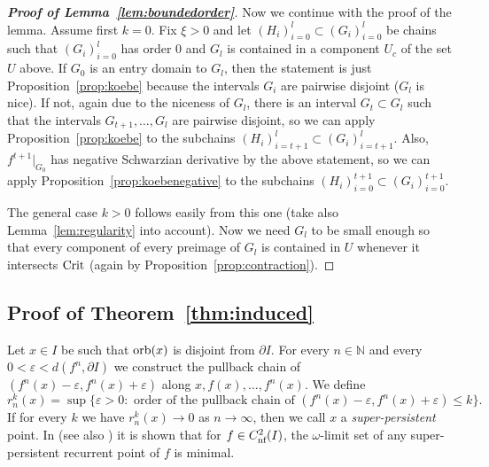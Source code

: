 \documentclass[12pt, psamsfonts, reqno]{amsart}
\newtheorem{theorem}{Theorem}
\begin{document}
\begin{proof}[\textbf{Proof of Lemma~\ref{lem:boundedorder}}]
Now we continue with the proof of the lemma. Assume first $k=0$.
Fix $\xi>0$ and let $(H_i)_{i=0}^l\subset (G_i)_{i=0}^l$ be chains
such that $(G_i)_{i=0}^l$ has order $0$ and $G_l$ is contained in
a component $U_c$ of the set $U$ above. If $G_0$ is an entry
domain to $G_l$, then the statement is just
Proposition~\ref{prop:koebe} because the intervals $G_i$ are
pairwise disjoint ($G_l$ is nice). If not, again due to the
niceness of $G_l$, there is an interval $G_t\subset G_l$ such that
the intervals $G_{t+1},\ldots, G_l$ are pairwise disjoint, so we
can apply Proposition~\ref{prop:koebe} to the subchains
$(H_i)_{i=t+1}^l\subset (G_i)_{i=t+1}^l$. Also, $f^{t+1}|_{G_0}$
has negative Schwarzian derivative by the above statement, so we
can apply Proposition~\ref{prop:koebenegative} to the subchains
$(H_i)_{i=0}^{t+1}\subset (G_i)_{i=0}^{t+1}$.

The general case $k>0$ follows easily from this one (take also
Lemma~\ref{lem:regularity} into account). Now we need $G_l$ to be
small enough so that every component of every preimage of $G_l$ is
contained in $U$ whenever it intersects ${\mathop{\rm Crit}\nolimits}$ (again by
Proposition~\ref{prop:contraction}).
\end{proof}

\subsection{Proof of Theorem~\ref{thm:induced}}

Let $x\in I$ be such that ${\mathop{\rm orb}\nolimits}(x)$ is disjoint from
$\partial I$.
For every $n \in {{\mathbb N}}$ and every $0 < {\varepsilon} < d(f^n, \partial I)$ we
construct the pullback chain of $(f^n(x)-{\varepsilon},f^n(x)+{\varepsilon})$ along
$x,f(x),\ldots,f^n(x)$. We
define
$$
r_n^k(x) = \sup\{ {\varepsilon} > 0 : \text{ order of the pullback chain of }
(f^n(x)-{\varepsilon},f^n(x)+{\varepsilon}) \leq k\}.
$$
If
for every $k$ we have $r_n^k(x)\to 0$ as $n\to \infty$, then we
call $x$ a \emph{super-persistent} point. In
\cite[Theorem~2.7]{BlMi} (see also \cite{BlMi2}) it is shown that
for  $f\in {C^2_{\text{\rm nf}}}(I)$, the $\omega$-limit set of any
super-persistent recurrent point of $f$
 is minimal.

\iffalse
\begin{theorem}
 \label{BloMis2}
 Let $f\in {C^2_{\text{\rm nf}}}(I)$.
 Then the $\omega$-limit set of any super-persistent recurrent point of $f$
 is minimal.
\end{theorem}
\fi
\end{document}
